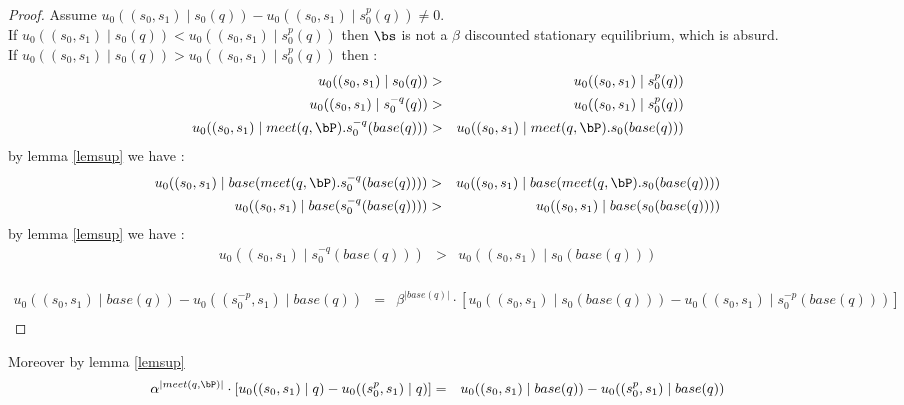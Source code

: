 \begin{proof}
Assume $u_0((s_0,s_1) \mid s_0(q)) - u_0((s_0,s_1) \mid s^p_0(q)) \neq 0$. 
\\ If $u_0((s_0,s_1) \mid s_0(q)) < u_0((s_0,s_1) \mid s^p_0(q)) $ then $\bs$ is not a $\beta$ discounted stationary equilibrium, which is absurd.
\\ If $u_0((s_0,s_1) \mid s_0(q)) > u_0((s_0,s_1) \mid s^p_0(q)) $ then :
\begin{eqnarray*}
u_0((s_0,s_1) \mid s_0(q)) &>& u_0((s_0,s_1) \mid s^p_0(q)) \\
u_0((s_0,s_1) \mid s^{-q}_0(q)) &>&  u_0((s_0,s_1) \mid s^p_0(q)) \\
u_0((s_0,s_1) \mid meet(q,\bP).s^{-q}_0(base(q))) &>& u_0((s_0,s_1) \mid meet(q,\bP) . s_0(base(q))) \\
\end{eqnarray*}
by lemma \ref{lemsup} we have : 
\begin{eqnarray*}
	u_0((s_0,s_1) \mid base(meet(q,\bP).s^{-q}_0(base(q)))) &>& u_0((s_0,s_1) \mid base(meet(q,\bP) . s_0(base(q)))) \\
	u_0((s_0,s_1) \mid base(s^{-q}_0(base(q)))) &>& u_0((s_0,s_1) \mid base(s_0(base(q)))) \\
\end{eqnarray*}
by lemma \ref{lemsup} we have : 
\begin{eqnarray*}
	u_0((s_0,s_1) \mid s^{-q}_0(base(q))) &>& u_0((s_0,s_1) \mid s_0(base(q))) \\
\end{eqnarray*}







\begin{eqnarray*}
	u_0((s_0,s_1) \mid base(q)) -  u_0((s^{-p}_0,s_1) \mid base(q)) 
	& = & \beta^{|base(q)|} \cdot[ u_0((s_0,s_1) \mid s_0(base(q))) - u_0((s_0,s_1) \mid s^{-p}_0(base(q)))] \\ 
\end{eqnarray*}




\end{proof}

\iffalse
Moreover by lemma \ref{lemsup}
\begin{eqnarray*}
	\alpha^{|meet(q,\bP)|} \cdot [u_0((s_0,s_1) \mid q) -  u_0((s^p_0,s_1) \mid q)] & = & u_0((s_0,s_1) \mid base(q)) -  u_0((s^p_0,s_1) \mid base(q))
\end{eqnarray*}


